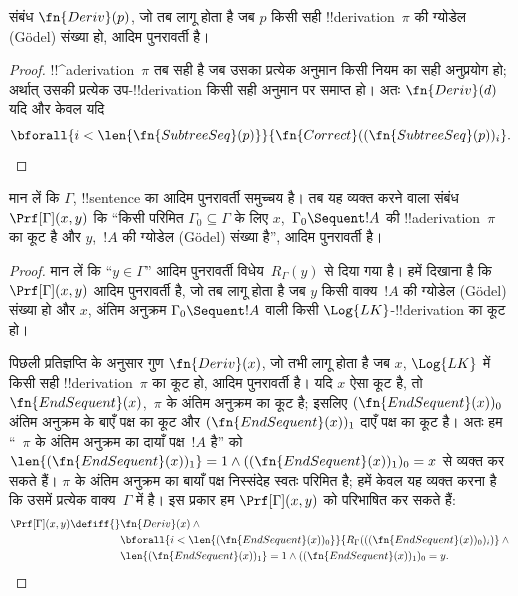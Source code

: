 \documentclass[../../../include/open-logic-section]{subfiles}
\begin{document}
\begin{prop}
  संबंध $\fn{Deriv}(p)$, जो तब लागू होता है जब $p$ किसी सही
  !!{derivation}~$\pi$ की ग्योडेल (G\"odel) संख्या हो, आदिम पुनरावर्ती है।
\end{prop}

\begin{proof}
  !!^a{derivation}~$\pi$ तब सही है जब उसका प्रत्येक अनुमान किसी नियम का सही
  अनुप्रयोग हो; अर्थात् उसकी प्रत्येक उप-!!{derivation} किसी सही अनुमान पर
  समाप्त हो। अतः $\fn{Deriv}(d)$ यदि और केवल यदि
  \[
  \bforall{i<\len{\fn{SubtreeSeq}(p)}}{\fn{Correct}((\fn{SubtreeSeq}(p))_i}.
  \]
\end{proof}


\begin{prop}
मान लें कि $\Gamma$, !!{sentence} का आदिम पुनरावर्ती समुच्चय है। तब यह
व्यक्त करने वाला संबंध $\Prf[\Gamma](x, y)$ कि ``किसी परिमित $\Gamma_0
\subseteq \Gamma$ के लिए $x$,~$\Gamma_0 \Sequent !A$ की
!!a{derivation}~$\pi$ का कूट है और $y$,~$!A$ की ग्योडेल (G\"odel) संख्या
है'', आदिम पुनरावर्ती है।
\end{prop}

\begin{proof}
मान लें कि ``$y \in \Gamma$'' आदिम पुनरावर्ती विधेय~$R_\Gamma(y)$ से दिया
गया है। हमें दिखाना है कि $\Prf[\Gamma](x, y)$ आदिम पुनरावर्ती है, जो तब
लागू होता है जब $y$ किसी वाक्य~$!A$ की ग्योडेल (G\"odel) संख्या हो और $x$,
अंतिम अनुक्रम $\Gamma_0 \Sequent !A$ वाली किसी $\Log{LK}$-!!{derivation} का
कूट हो।

पिछली प्रतिज्ञप्ति के अनुसार गुण $\fn{Deriv}(x)$, जो तभी लागू होता है जब $x$,
$\Log{LK}$ में किसी सही !!{derivation}~$\pi$ का कूट हो, आदिम पुनरावर्ती है।
यदि $x$ ऐसा कूट है, तो $\fn{EndSequent}(x)$,~$\pi$ के अंतिम अनुक्रम का कूट
है; इसलिए $(\fn{EndSequent}(x))_0$ अंतिम अनुक्रम के बाएँ पक्ष का कूट और
$(\fn{EndSequent}(x))_1$ दाएँ पक्ष का कूट है। अतः हम ``~$\pi$ के अंतिम
अनुक्रम का दायाँ पक्ष~$!A$ है'' को $\len{(\fn{EndSequent}(x))_1} = 1 \land
((\fn{EndSequent}(x))_1)_0 = x$ से व्यक्त कर सकते हैं। $\pi$ के अंतिम अनुक्रम
का बायाँ पक्ष निस्संदेह स्वतः परिमित है; हमें केवल यह व्यक्त करना है कि उसमें
प्रत्येक वाक्य~$\Gamma$ में है। इस प्रकार हम $\Prf[\Gamma](x, y)$ को परिभाषित
कर सकते हैं:
\begin{align*}
\Prf[\Gamma](x, y) \defiff {}&
\fn{Deriv}(x) \land {} \\
& \bforall{i <
  \len{(\fn{EndSequent}(x))_0}}{R_\Gamma(((\fn{EndSequent}(x))_0)_i)} \land {}\\
& \len{(\fn{EndSequent}(x))_1} = 1 \land ((\fn{EndSequent}(x))_1)_0 = y.
\end{align*}
\end{proof}
\end{document}
